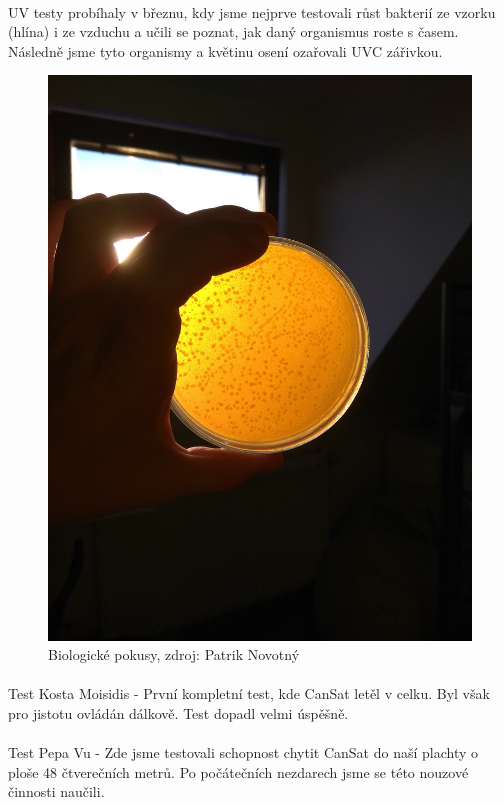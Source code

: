 \documentclass[a4paper]{report}
\begin{document}
\paragraph{} UV testy probíhaly v březnu, kdy jsme nejprve testovali růst bakterií ze vzorku (hlína) i ze vzduchu a učili se poznat, jak daný organismus roste s časem. Následně jsme tyto organismy a květinu osení ozařovali UVC zářivkou.
\begin{figure}[H]
\caption{Biologické pokusy, zdroj: Patrik Novotný}
\centering
\includegraphics[width=400pt]{Biopokusy.jpg}
\end{figure}
\paragraph{} Test Kosta Moisidis - První kompletní test, kde CanSat letěl v celku. Byl však pro jistotu ovládán dálkově. Test dopadl velmi úspěšně.
\paragraph{} Test Pepa Vu - Zde jsme testovali schopnost chytit CanSat do naší plachty o ploše 48 čtverečních metrů. Po počátečních nezdarech jsme se této nouzové činnosti naučili.
\end{document}
